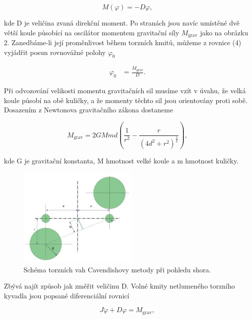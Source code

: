 \documentclass[a4paper,11pt]{article}
\begin{document}
\begin{equation}
M(\varphi) = -D\varphi,
\end{equation}

\noindent
kde D je veličina zvaná direkční moment. Po stranách jsou navíc umístěné dvě větší koule působící na oscilátor momentem gravitační síly $M_{\text{grav}}$ jako na obrázku 2. Zanedbáme-li její proměnlivost během torzních kmitů, můžeme z rovnice (4) vyjádřit posun rovnovážné polohy $\varphi_0$

\begin{align}
  \varphi_0 &= \frac{M_{\text{grav}}}{D}.
\end{align}

Při odvozování velikosti momentu gravitačních sil musíme vzít v úvahu, že velká koule působí na obě kuličky, a že momenty těchto sil jsou orientovány proti sobě. Dosazením z Newtonova gravitačního zákona dostaneme

\begin{equation}
  M_{\text{grav}} = 2GMmd \left( \frac{1}{r^2} - \frac{r}{(4d^2+r^2)^{\frac{3}{2}}} \right),
\end{equation}

\noindent
kde G je gravitační konstanta, M hmotnost velké koule a m hmotnost kuličky. 

\begin{figure}[htpb]
  \centering
  \includegraphics[width=0.52\textwidth]{cavendish_vahy.jpg}
  \caption{Schéma torzních vah Cavendishovy metody při pohledu shora.}
\end{figure}

\newpage

Zbývá najít způsob jak změřit veličinu D. Volné kmity netlumeného torzního kyvadla jsou popsané diferenciální rovnicí

\begin{equation}
J \ddot{\varphi} + D \varphi = M_{\text{grav}},
\end{equation}
\end{document}
